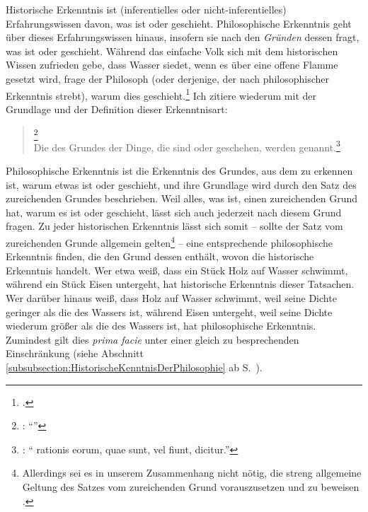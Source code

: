Historische Erkenntnis ist (inferentielles oder nicht-inferentielles)
Erfahrungswissen davon, was ist oder geschieht. Philosophische Erkenntnis geht
über dieses Erfahrungswissen hinaus, insofern sie nach den \emph{Gründen} dessen
fragt, was ist oder geschieht. Während das einfache Volk sich mit dem
historischen Wissen zufrieden gebe, dass Wasser siedet, wenn es über eine offene
Flamme gesetzt wird, frage der Philosoph (oder derjenige, der nach
philosophischer Erkenntnis strebt), warum dies
geschieht.\footnote{\cite[Vgl.][\S~23]{Wolff:Discursuspraeliminarisdephilosophiaingenere1996}.}
Ich zitiere 
wiederum mit der Grundlage und der Definition dieser Erkenntnisart:
\begin{quote}
  \footnote{\Cite[][\S~4]{Wolff:Discursuspraeliminarisdephilosophiaingenere1996}:
  \enquote{}}\\
  Die  des Grundes der Dinge, die sind oder geschehen, werden
  genannt.\footnote{\Cite[][\S~6]{Wolff:Discursuspraeliminarisdephilosophiaingenere1996}:
  \enquote{ rationis eorum, quae sunt, vel fiunt,
   dicitur.}}
\end{quote}
Philosophische Erkenntnis ist die Erkenntnis des Grundes, aus dem zu erkennen
ist, warum etwas ist oder geschieht, und ihre Grundlage wird durch den Satz des
zureichenden Grundes beschrieben. Weil alles, was ist, einen zureichenden Grund
hat, warum es ist oder geschieht, lässt sich auch jederzeit nach diesem Grund
fragen. Zu jeder historischen Erkenntnis lässt sich somit -- sollte der Satz vom
zureichenden Grunde allgemein gelten\footnote{Allerdings sei es in unserem
Zusammenhang nicht nötig, die streng allgemeine Geltung des Satzes vom
zureichenden Grund vorauszusetzen und zu beweisen
\parencite[vgl.][\S~5]{Wolff:Discursuspraeliminarisdephilosophiaingenere1996}.}
-- eine entsprechende philosophische Erkenntnis finden, die den Grund dessen
enthält, wovon die historische Erkenntnis handelt. Wer etwa weiß, dass ein Stück
Holz auf Wasser schwimmt, während ein Stück Eisen untergeht, hat historische Erkenntnis
dieser Tatsachen. Wer darüber hinaus weiß, dass Holz auf Wasser schwimmt, weil
seine Dichte geringer als die des Wassers ist, während Eisen untergeht, weil
seine Dichte wiederum größer als die des Wassers ist, hat philosophische
Erkenntnis. Zumindest gilt dies \emph{prima facie} unter einer gleich zu
besprechenden Einschränkung (siehe Abschnitt
\ref{subsubsection:HistorischeKenntnisDerPhilosophie} ab
S.~\pageref{subsubsection:HistorischeKenntnisDerPhilosophie}).

